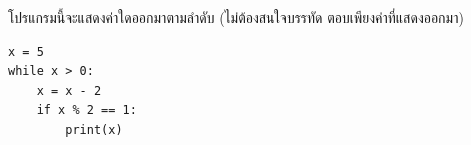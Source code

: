 ﻿%
\question โปรแกรมนี้จะแสดงค่าใดออกมาตามลำดับ (ไม่ต้องสนใจบรรทัด ตอบเพียงค่าที่แสดงออกมา)
\begin{verbatim}
x = 5
while x > 0:
    x = x - 2
    if x % 2 == 1:
        print(x)
\end{verbatim}

